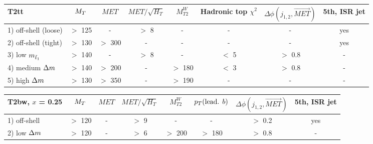             \begin{table}[!ht]
                {\footnotesize
            \begin{center}
            \hspace*{-0.8cm}
                    \begin{tabular}{|l|ccccccc|}
                        \hline
                        \textbf{T2tt}          & $M_T$   & $MET$    & $MET/\sqrt{H_T}$  & $M_{T2}^W$ & Hadronic top $\chi^2$ & $\Delta\phi(j_{1,2},\vec{MET})$      &   5th, ISR jet \\
                    \hline                                                                                                                                     
                    1) off-shell (loose)       & $>$ 125 & -       &   $>$ 8            &     -     & -             &          - &    yes        \\
                    2) off-shell (tight)       & $>$ 130 & $>$ 300 &   -                &     -     & -        	    &          - &    yes        \\
                    3) low    $m_{\tilde{t}_1}$  & $>$ 140 & -       &   $>$ 8            &     -     &  $<$ 5        &  $>$ 0.8   &    -          \\
                    4) medium $\Delta m$        & $>$ 140 & $>$ 200 &   -                &  $>$ 180  &  $<$ 3        &  $>$ 0.8   &    -          \\
                    5) high   $\Delta m$        & $>$ 130 & $>$ 350 &   -                &  $>$ 190  & -             &          - &    -          \\
                        \hline
                    \end{tabular}
            \hspace*{-0.5cm}
                    \begin{tabular}{|l|ccccccc|}
                        \hline
                        \textbf{T2bw}, $x$ = 0.25        & $M_T$     & $MET$    & $MET/\sqrt{H_T}$ & $M_{T2}^W$ & $p_T(\text{lead. }b)$ & $\Delta\phi(j_{1,2},\vec{MET})$ & 5th, ISR jet  \\
                    \hline                                                                                                                      
                    1) off-shell       & $>$ 120   &  -       &    $>$  9       &     -      &   -                   &  $>$ 0.2      & yes           \\
                    2) low    $\Delta m$ & $>$ 120   &  -       &    $>$  6       &  $>$ 200   & $>$ 180               &  $>$ 0.8      & -             \\

\end{tabular}
\end{center}}
\end{table}
